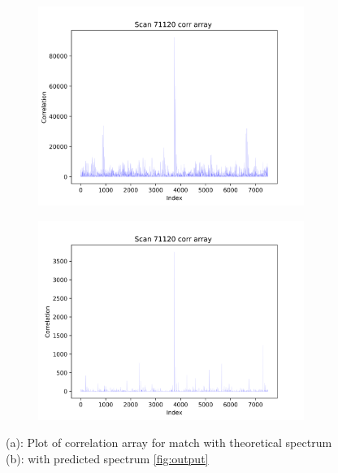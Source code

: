 \documentclass[11pt]{article}
\begin{document}
\begin{figure}
\centering
\begin{subfigure}[b]{1\textwidth}
    \includegraphics[width=0.95\textwidth]{figs/corrtheo.png}
   \caption{}
   \label{fig:corrtheo} 
\end{subfigure}
\begin{subfigure}[b]{1\textwidth}
   \includegraphics[width=0.95\textwidth]{figs/corrpredict.png}
   \caption{}
   \label{fig:corrpredict}
\end{subfigure}
\caption{(a): Plot of correlation array for match with theoretical spectrum (b): with predicted spectrum \cref{fig:output}}
\label{predandtheocorr}
\end{figure}
\end{document}
